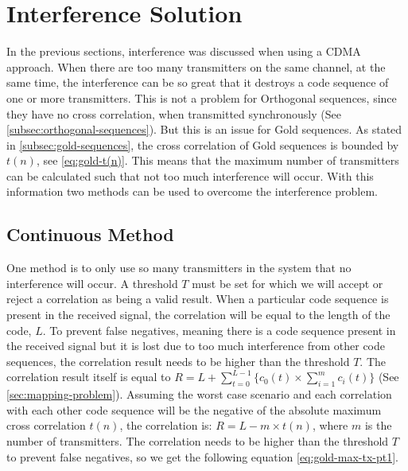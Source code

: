 
\section{Interference Solution}
\label{sec:interference-solution}

In the previous sections, interference was discussed when using a CDMA approach.
When there are too many transmitters on the same channel, at the same time, the interference can be so great that it destroys a code sequence of one or more transmitters.
This is not a problem for Orthogonal sequences, since they have no cross correlation, when transmitted synchronously (See \autoref{subsec:orthogonal-sequences}).
But this is an issue for Gold sequences. 
As stated in \autoref{subsec:gold-sequences}, the cross correlation of Gold sequences is bounded by $t(n)$, see \autoref{eq:gold-t(n)}.
This means that the maximum number of transmitters can be calculated such that not too much interference will occur. 
With this information two methods can be used to overcome the interference problem.



\subsection{Continuous Method}
\label{subsec:continuous-method-modulation}


One method is to only use so many transmitters in the system that no interference will occur.
A threshold $T$ must be set for which we will accept or reject a correlation as being a valid result.
When a particular code sequence is present in the received signal, the correlation will be equal to the length of the code, $L$.
To prevent false negatives, meaning there is a code sequence present in the received signal but it is lost due to too much interference from other code sequences, the correlation result needs to be higher than the threshold $T$.
The correlation result itself is equal to $R = L + \displaystyle\sum_{t = 0} ^ {L - 1} \Bigg\{ c_0(t) \times  \displaystyle\sum_{i = 1} ^ {m} c_i(t) \Bigg\} $ (See \autoref{sec:mapping-problem}).
Assuming the worst case scenario and each correlation with each other code sequence will be the negative of the absolute maximum cross correlation $t(n)$, the correlation is: $R = L - m \times t(n)$, where $m$ is the number of transmitters.
The correlation needs to be higher than the threshold $T$ to prevent false negatives, so we get the following equation \autoref{eq:gold-max-tx-pt1}.

